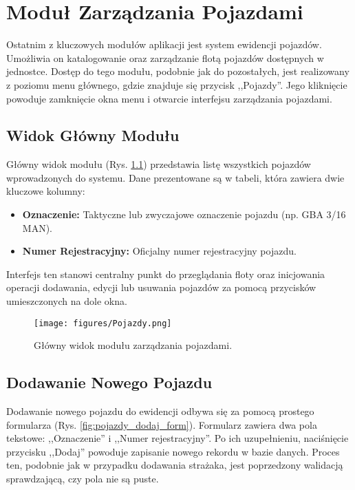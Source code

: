 \chapter{Moduł Zarządzania Pojazdami}
\label{chap:pojazdy}

Ostatnim z kluczowych modułów aplikacji jest system ewidencji pojazdów. Umożliwia on katalogowanie oraz zarządzanie flotą pojazdów dostępnych w jednostce. Dostęp do tego modułu, podobnie jak do pozostałych, jest realizowany z poziomu menu głównego, gdzie znajduje się przycisk ,,Pojazdy''. Jego kliknięcie powoduje zamknięcie okna menu i otwarcie interfejsu zarządzania pojazdami.

\section{Widok Główny Modułu}
\label{sec:pojazdy_widok}

Główny widok modułu (Rys. \ref{fig:pojazdy_lista}) przedstawia listę wszystkich pojazdów wprowadzonych do systemu. Dane prezentowane są w tabeli, która zawiera dwie kluczowe kolumny:
\begin{itemize}
    \item \textbf{Oznaczenie:} Taktyczne lub zwyczajowe oznaczenie pojazdu (np. GBA 3/16 MAN).
    \item \textbf{Numer Rejestracyjny:} Oficjalny numer rejestracyjny pojazdu.
\end{itemize}
Interfejs ten stanowi centralny punkt do przeglądania floty oraz inicjowania operacji dodawania, edycji lub usuwania pojazdów za pomocą przycisków umieszczonych na dole okna.

\begin{figure}[H]
	\centering
	\texttt{[image: figures/Pojazdy.png]}
	\caption{Główny widok modułu zarządzania pojazdami.}
	\label{fig:pojazdy_lista}
\end{figure}

\section{Dodawanie Nowego Pojazdu}
\label{sec:pojazdy_dodaj}

Dodawanie nowego pojazdu do ewidencji odbywa się za pomocą prostego formularza (Rys. \ref{fig:pojazdy_dodaj_form}). Formularz zawiera dwa pola tekstowe: ,,Oznaczenie'' i ,,Numer rejestracyjny''. Po ich uzupełnieniu, naciśnięcie przycisku ,,Dodaj'' powoduje zapisanie nowego rekordu w bazie danych. Proces ten, podobnie jak w przypadku dodawania strażaka, jest poprzedzony walidacją sprawdzającą, czy pola nie są puste.

